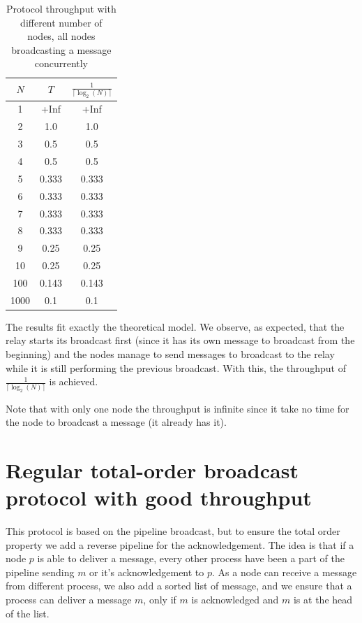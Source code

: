 \documentclass[a4paper]{article}
\begin{document}
\begin{table}[H]
    \centering
    \begin{tabular}{|c|c|c|}
        \hline
        $N$   & $T$  & $\frac{1}{\lceil\log_2(N)\rceil}$ \\
        \hline
        1     & +Inf   & +Inf   \\
        2     & 1.0    & 1.0    \\
        3     & 0.5    & 0.5    \\
        4     & 0.5    & 0.5    \\
        5     & 0.333  & 0.333  \\
        6     & 0.333  & 0.333  \\
        7     & 0.333  & 0.333  \\
        8     & 0.333  & 0.333  \\
        9     & 0.25   & 0.25   \\
        10    & 0.25   & 0.25   \\
        100   & 0.143  & 0.143  \\
        1000  & 0.1    & 0.1    \\
        \hline
    \end{tabular}
    \caption{Protocol throughput with different number of nodes, all nodes broadcasting a message concurrently}
    \label{table:thr}
\end{table}

The results fit exactly the theoretical model. We observe, as expected, that
the relay starts its broadcast first (since it has its own message to
broadcast from the beginning) and the nodes manage to send messages to
broadcast to the relay while it is still performing the previous broadcast.
With this, the throughput of $\frac{1}{\lceil\log_2(N)\rceil}$ is achieved.

Note that with only one node the throughput is infinite since it take no time
for the node to broadcast a message (it already has it).

\section{Regular total-order broadcast protocol with good throughput}
\label{sec:throughputTO}
This protocol is based on the pipeline broadcast, but to ensure the total order
property we add a reverse pipeline for the acknowledgement. The idea is that if
a node $p$ is able to deliver a message, every other process have been a part of
the pipeline sending $m$ or it's acknowledgement to $p$. As a node can receive
a message from different process, we also add a sorted list of message, and we
ensure that a process can deliver a message $m$, only if $m$ is acknowledged
and $m$ is at the head of the list.
\end{document}
